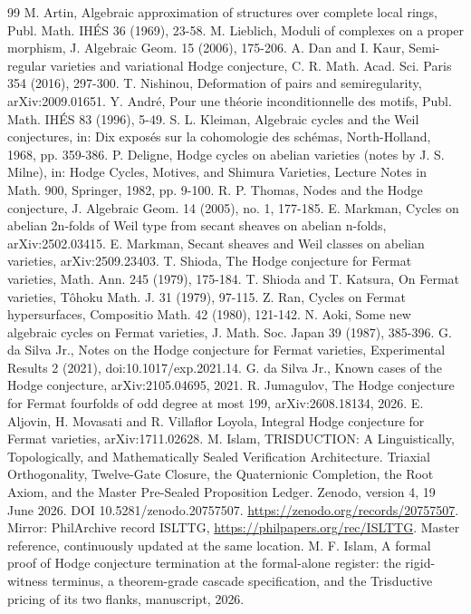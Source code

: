 \documentclass[10pt,twocolumn]{article}
\begin{document}
\begin{thebibliography}{99}
 M. Artin, Algebraic approximation of structures over complete local rings, Publ. Math. IHÉS 36 (1969), 23-58.
 M. Lieblich, Moduli of complexes on a proper morphism, J. Algebraic Geom. 15 (2006), 175-206.
 A. Dan and I. Kaur, Semi-regular varieties and variational Hodge conjecture, C. R. Math. Acad. Sci. Paris 354 (2016), 297-300.
 T. Nishinou, Deformation of pairs and semiregularity, arXiv:2009.01651.
 Y. André, Pour une théorie inconditionnelle des motifs, Publ. Math. IHÉS 83 (1996), 5-49.
 S. L. Kleiman, Algebraic cycles and the Weil conjectures, in: Dix exposés sur la cohomologie des schémas, North-Holland, 1968, pp. 359-386.
 P. Deligne, Hodge cycles on abelian varieties (notes by J. S. Milne), in: Hodge Cycles, Motives, and Shimura Varieties, Lecture Notes in Math. 900, Springer, 1982, pp. 9-100.
 R. P. Thomas, Nodes and the Hodge conjecture, J. Algebraic Geom. 14 (2005), no. 1, 177-185.
 E. Markman, Cycles on abelian 2n-folds of Weil type from secant sheaves on abelian n-folds, arXiv:2502.03415.
 E. Markman, Secant sheaves and Weil classes on abelian varieties, arXiv:2509.23403.
 T. Shioda, The Hodge conjecture for Fermat varieties, Math. Ann. 245 (1979), 175-184.
 T. Shioda and T. Katsura, On Fermat varieties, Tôhoku Math. J. 31 (1979), 97-115.
 Z. Ran, Cycles on Fermat hypersurfaces, Compositio Math. 42 (1980), 121-142.
 N. Aoki, Some new algebraic cycles on Fermat varieties, J. Math. Soc. Japan 39 (1987), 385-396.
 G. da Silva Jr., Notes on the Hodge conjecture for Fermat varieties, Experimental Results 2 (2021), doi:10.1017/exp.2021.14.
 G. da Silva Jr., Known cases of the Hodge conjecture, arXiv:2105.04695, 2021.
 R. Jumagulov, The Hodge conjecture for Fermat fourfolds of odd degree at most 199, arXiv:2608.18134, 2026.
 E. Aljovin, H. Movasati and R. Villaflor Loyola, Integral Hodge conjecture for Fermat varieties, arXiv:1711.02628.
 M. Islam, TRISDUCTION: A Linguistically, Topologically, and Mathematically Sealed Verification Architecture. Triaxial Orthogonality, Twelve-Gate Closure, the Quaternionic Completion, the Root Axiom, and the Master Pre-Sealed Proposition Ledger. Zenodo, version 4, 19 June 2026. DOI 10.5281/zenodo.20757507. \url{https://zenodo.org/records/20757507}. Mirror: PhilArchive record ISLTTG, \url{https://philpapers.org/rec/ISLTTG}. Master reference, continuously updated at the same location.
 M. F. Islam, A formal proof of Hodge conjecture termination at the formal-alone register: the rigid-witness terminus, a theorem-grade cascade specification, and the Trisductive pricing of its two flanks, manuscript, 2026.
\end{thebibliography}
\end{document}
